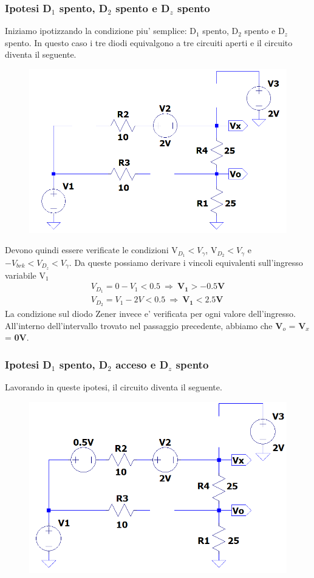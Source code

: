 \documentclass[a4paper,10pt]{article}
\begin{document}
\subsubsection{Ipotesi D$_1$ spento, D$_2$ spento e D$_z$ spento}
Iniziamo ipotizzando la condizione piu' semplice: D$_1$ spento, D$_2$ spento e D$_z$ spento. In questo caso i tre diodi equivalgono a tre circuiti aperti e il circuito diventa il seguente. \newline
\begin{figure}[h!]
  	\centering
 	\includegraphics[width=0.3\linewidth]{es1-1-1.png}
\end{figure}

\noindent Devono quindi essere verificate le condizioni V$_{D_1}<V_{\gamma}$, V$_{D_2} < V_{\gamma}$ e $-V_{brk} < V_{D_z} < V_{\gamma}$.
Da queste possiamo derivare i vincoli equivalenti sull'ingresso variabile V$_1$
	\begin{align*}
		V_{D_1} = 0 - V_{1} < 0.5 \ \Rightarrow \ \mathbf{V_{1} >	-0.5V} \\
		V_{D_2} = V_{1} - 2V < 0.5 \ \Rightarrow \ \mathbf{V_{1} < 2.5V}
	\end{align*}
La condizione sul diodo Zener invece e' verificata per ogni valore dell'ingresso. All'interno dell'intervallo trovato nel passaggio precedente, abbiamo che \textbf{V$_o$} = \textbf{V$_x$} = \textbf{0V}. \newline

\subsubsection{Ipotesi D$_1$ spento, D$_2$ acceso e D$_z$ spento}
Lavorando in queste ipotesi, il circuito diventa il seguente. \newline
\begin{figure}[h!]
  	\centering
 	\includegraphics[width=0.3\linewidth]{es1-1-3.png}
\end{figure}
\end{document}
